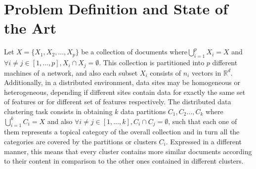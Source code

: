 \documentclass[10pt]{article}
\begin{document}
\section{Problem Definition and State of the Art}
Let $X=\{X_1,X_2,\ldots ,X_p\}$ be a collection of documents where\(\bigcup_{i=1}^p X_i=X\) and \(\forall i\neq j \in [1,\ldots ,p], X_i\cap X_j=\emptyset\). This collection is partitioned into $p$ different machines of a network, and also each subset $X_i$ consists of $n_i$ vectors in $\mathbb{R}^d$. Additionally, in a distributed environment, data sites may be homogeneous or heterogeneous, depending if different sites contain data for exactly the same set of features or for different set of features respectively.  
The distributed data clustering task consists in obtaining $k$ data partitions \(C_1,C_2\ldots,C_k\) where \(\bigcup_{i=1}^k C_i=X\) and also \(\forall i\neq j \in [1,\ldots ,k], C_i\cap C_j=\emptyset\), such that each one of them represents a topical category of the overall collection and in turn all the categories are covered by the partitions or clusters $C_i$. Expressed in a different manner, this means that every cluster contains more similar documents according to their content in comparison to the other ones contained in different clusters.
\end{document}
